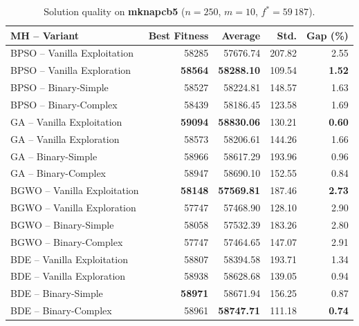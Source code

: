 \documentclass[journal,article,submit,moreauthors]{Definitions/mdpi}
\begin{document}
\begin{table}[htbp]
  \centering
  \small
  \caption{Solution quality on \textbf{mknapcb5}
  ($n=250$, $m=10$, $f^*=59\,187$).}
  \label{tab:calidad_mknapcb5}
  \begin{tabular}{lrrrr}
    \toprule
    \textbf{MH -- Variant} &
    \textbf{Best Fitness} &
    \textbf{Average} &
    \textbf{Std.} &
    \textbf{Gap (\%)} \\
    \midrule
    BPSO -- Vanilla Exploitation & 58285 & 57676.74 & 207.82 & 2.55 \\
    BPSO -- Vanilla Exploration  & \textbf{58564} & \textbf{58288.10} & 109.54 & \textbf{1.52} \\
    BPSO -- Binary-Simple        & 58527 & 58224.81 & 148.57 & 1.63 \\
    BPSO -- Binary-Complex       & 58439 & 58186.45 & 123.58 & 1.69 \\
    \midrule
    GA -- Vanilla Exploitation   & \textbf{59094} & \textbf{58830.06} & 130.21 & \textbf{0.60} \\
    GA -- Vanilla Exploration    & 58573 & 58206.61 & 144.26 & 1.66 \\
    GA -- Binary-Simple          & 58966 & 58617.29 & 193.96 & 0.96 \\
    GA -- Binary-Complex         & 58947 & 58690.10 & 152.55 & 0.84 \\
    \midrule
    BGWO -- Vanilla Exploitation & \textbf{58148} & \textbf{57569.81} & 187.46 & \textbf{2.73} \\
    BGWO -- Vanilla Exploration  & 57747 & 57468.90 & 128.10 & 2.90 \\
    BGWO -- Binary-Simple        & 58058 & 57532.39 & 183.26 & 2.80 \\
    BGWO -- Binary-Complex       & 57747 & 57464.65 & 147.07 & 2.91 \\
    \midrule
    BDE -- Vanilla Exploitation  & 58807 & 58394.58 & 193.71 & 1.34 \\
    BDE -- Vanilla Exploration   & 58938 & 58628.68 & 139.05 & 0.94 \\
    BDE -- Binary-Simple         & \textbf{58971} & 58671.94 & 156.25 & 0.87 \\
    BDE -- Binary-Complex        & 58961 & \textbf{58747.71} & 111.18 & \textbf{0.74} \\
    \bottomrule
  \end{tabular}
\end{table}
\end{document}
